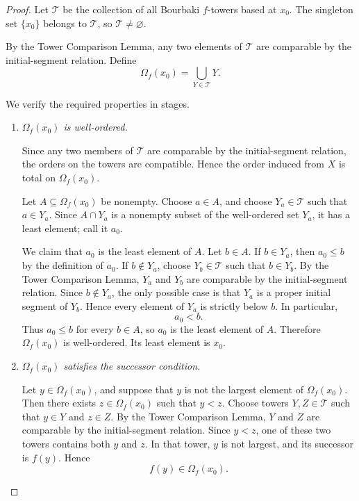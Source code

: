 \documentclass[11pt]{article}
\theoremstyle{definition}
\theoremstyle{remark}
\begin{document}
\begin{proof}
Let \(\mathcal T\) be the collection of all Bourbaki \(f\)-towers based at \(x_0\). The
singleton set \(\{x_0\}\) belongs to \(\mathcal T\), so \(\mathcal T\neq\varnothing\).

By the Tower Comparison Lemma, any two elements of \(\mathcal T\) are comparable by
the initial-segment relation. Define
\[
\Omega_f(x_0)=\bigcup_{Y\in\mathcal T}Y.
\]

We verify the required properties in stages.

\begin{enumerate}
\item \emph{\(\Omega_f(x_0)\) is well-ordered.}

Since any two members of \(\mathcal T\) are comparable by the initial-segment relation,
the orders on the towers are compatible. Hence the order induced from \(X\) is total on
\(\Omega_f(x_0)\).

Let \(A\subseteq \Omega_f(x_0)\) be nonempty. Choose \(a\in A\), and choose
\(Y_a\in\mathcal T\) such that \(a\in Y_a\). Since \(A\cap Y_a\) is a nonempty subset of
the well-ordered set \(Y_a\), it has a least element; call it \(a_0\).

We claim that \(a_0\) is the least element of \(A\). Let \(b\in A\). If \(b\in Y_a\), then
\(a_0\leq b\) by the definition of \(a_0\). If \(b\notin Y_a\), choose
\(Y_b\in\mathcal T\) such that \(b\in Y_b\). By the Tower Comparison Lemma, \(Y_a\) and
\(Y_b\) are comparable by the initial-segment relation. Since \(b\notin Y_a\), the only
possible case is that \(Y_a\) is a proper initial segment of \(Y_b\). Hence every element
of \(Y_a\) is strictly below \(b\). In particular,
\[
a_0<b.
\]
Thus \(a_0\leq b\) for every \(b\in A\), so \(a_0\) is the least element of \(A\).
Therefore \(\Omega_f(x_0)\) is well-ordered. Its least element is \(x_0\).

\item \emph{\(\Omega_f(x_0)\) satisfies the successor condition.}

Let \(y\in\Omega_f(x_0)\), and suppose that \(y\) is not the largest element of
\(\Omega_f(x_0)\). Then there exists \(z\in\Omega_f(x_0)\) such that \(y<z\). Choose
towers \(Y,Z\in\mathcal T\) such that \(y\in Y\) and \(z\in Z\). By the Tower Comparison
Lemma, \(Y\) and \(Z\) are comparable by the initial-segment relation. Since \(y<z\), one
of these two towers contains both \(y\) and \(z\). In that tower, \(y\) is not largest, and
its successor is \(f(y)\). Hence
\[
f(y)\in\Omega_f(x_0).
\]


\end{enumerate}
\end{proof}
\end{document}
